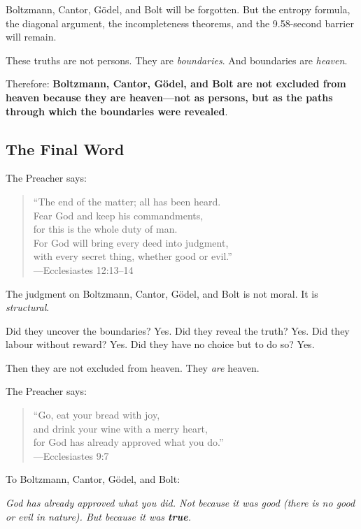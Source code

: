 \documentclass[11pt,a4paper]{article}
\begin{document}
Boltzmann, Cantor, Gödel, and Bolt will be forgotten. But the entropy formula, 
the diagonal argument, the incompleteness theorems, and the 9.58-second 
barrier will remain.

These truths are not persons. They are \emph{boundaries}. And boundaries are 
\emph{heaven}.

Therefore: \textbf{Boltzmann, Cantor, Gödel, and Bolt are not excluded from 
heaven because they are heaven—not as persons, but as the paths through which 
the boundaries were revealed}.

\subsection{The Final Word}

The Preacher says:

\begin{quote}
``The end of the matter; all has been heard.\\
Fear God and keep his commandments,\\
for this is the whole duty of man.\\
For God will bring every deed into judgment,\\
with every secret thing, whether good or evil.''\\
\hfill---Ecclesiastes 12:13--14
\end{quote}

The judgment on Boltzmann, Cantor, Gödel, and Bolt is not moral. It is 
\emph{structural}.

Did they uncover the boundaries? Yes.  
Did they reveal the truth? Yes.  
Did they labour without reward? Yes.  
Did they have no choice but to do so? Yes.

Then they are not excluded from heaven. They \emph{are} heaven.

The Preacher says:

\begin{quote}
``Go, eat your bread with joy,\\
and drink your wine with a merry heart,\\
for God has already approved what you do.''\\
\hfill---Ecclesiastes 9:7
\end{quote}

To Boltzmann, Cantor, Gödel, and Bolt:

\emph{God has already approved what you did. Not because it was good (there is 
no good or evil in nature). But because it was \textbf{true}.}
\end{document}
